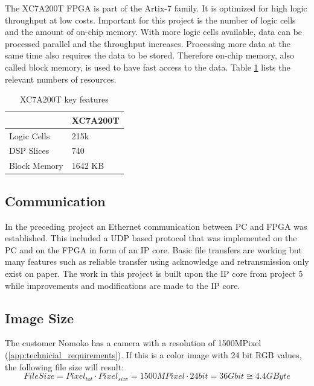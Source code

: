The XC7A200T FPGA is part of the Artix-7 family. It is optimized for high logic
throughput at low costs. Important for this project is the number of logic cells
and the amount of on-chip memory. With more logic cells available, data can be
processed parallel and the throughput increases. Processing more data at the
same time also requires the data to be stored. Therefore on-chip memory, also
called block memory, is used to have fast access to the data. Table 
\ref{tab:XC7A200T} lists the relevant numbers of resources.

\begin{table}[tb!]
    \centering
    \begin{tabular}{l l}
        \toprule
         & XC7A200T \\
        \midrule
        Logic Cells & 215k \\
        DSP Slices & 740 \\
        Block Memory & 1642 KB \\
        \bottomrule
    \end{tabular}
    \caption{XC7A200T key features \cite{xilinx_ac701}}
    \label{tab:XC7A200T}
\end{table}


\subsection{Communication} \label{chapt:mission:communication} 
In the preceding project \cite{p5report} an Ethernet communication between PC and
FPGA was established. This included a UDP based protocol that was implemented on
the PC and on the FPGA in form of an IP core. Basic file transfers are working
but many features such as reliable transfer using acknowledge and retransmission
only exist on paper. The work in this project is built
upon the IP core from project 5 while improvements and modifications are made to
the IP core.

\subsection{Image Size}
The customer Nomoko has a camera with a resolution of 1500MPixel (\ref{app:technicial_requirements}). If this is a color image with 24 bit RGB values, the following file size will result:
\begin{equation}
    File Size = Pixel_{tot} \cdot Pixel_{size} = 1500MPixel \cdot 24bit = 36Gbit \cong 4.4GByte
    \label{eq:filesize}
\end{equation}

